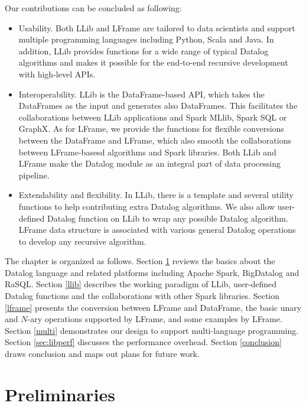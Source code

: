 Our contributions can be concluded as following:
\begin{itemize}
	
	\item Usability. Both LLib and LFrame are tailored to data scientists and support multiple programming languages including Python, Scala and Java. In addition, LLib  provides functions for a wide range of typical Datalog algorithms and makes it possible for the end-to-end  recursive development  with high-level APIs.
	\item Interoperability. LLib is the DataFrame-based API, which takes the DataFrames as the input and generates also DataFrames. This facilitates the collaborations between LLib applications and Spark MLlib, Spark SQL or GraphX. As for LFrame, we provide the functions for flexible conversions between the  DataFrame and LFrame, which also smooth the collaborations between LFrame-basesd algorithms and Spark libraries. Both LLib and LFrame make the Datalog module as an integral part of data processing pipeline. 
	\item Extendability and flexibility. In LLib, there is a template and several utility functions to help  contributing extra Datalog algorithms. We also allow user-defined Datalog function on LLib to wrap any possible Datalog algorithm.  LFrame data structure is associated with various general Datalog operations to develop any recursive algorithm.
\end{itemize}
The chapter is organized as follows. Section \ref{pre} reviews the basics about the Datalog language and related platforms including Apache Spark, BigDatalog and RaSQL. Section \ref{llib} describes the working paradigm of LLib,  
user-defined Datalog functions and the collaborations with other Spark libraries. 
Section \ref{lframe} presents the conversion between LFrame and DataFrame, the basic unary and $N$-ary operations supported by LFrame, and some examples by LFrame. Section \ref{multi} demonstrates our design to support multi-language programming. Section \ref{sec:libperf} discusses the performance overhead. Section \ref{conclusion} draws  conclusion and maps out plans for future work.

\section{Preliminaries}
\label{pre}
